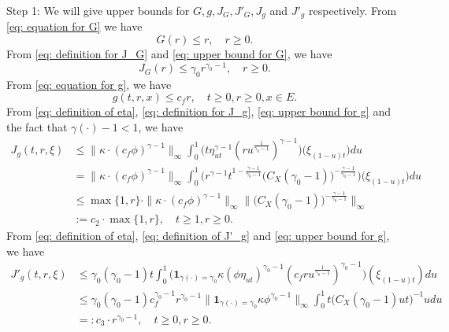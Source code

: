 \documentclass[12pt, a4paper]{amsart}
\theoremstyle{definition}
\numberwithin{equation}{section}
\begin{document}
	Step 1:
	We will give upper bounds for $G,g, J_G, J'_G, J_g$ and $J'_g$ respectively.
	From \eqref{eq: equation for G} we have
\begin{equation}\label{eq: upper bound for G}
	G(r)
	\leq r,
	\quad r \geq 0.
\end{equation}	
	From \eqref{eq: definition for J_G} and \eqref{eq: upper bound for G}, we have
\begin{equation}\label{eq: upper bound for J_G}
	J_G(r)
	\leq \gamma_0 r^{\gamma_0 - 1},
	\quad r \geq 0.
\end{equation}
	From \eqref{eq: equation for g}, we have
\begin{equation}\label{eq: upper bound for g}
	g(t,r, x) \leq c_f r,
	\quad t\geq 0, r \geq 0, x\in E.
\end{equation}
	From \eqref{eq: definition of eta}, \eqref{eq: definition for J_g}, \eqref{eq: upper bound for g} and the fact that $\gamma(\cdot) - 1 < 1$, we have
\begin{equation}\begin{split}
	J_g(t,r, \xi)
	&\leq \|\kappa \cdot (c_f\phi)^{\gamma - 1} \|_\infty \int_0^1 \big(  t\eta_{ut}^{\gamma - 1} (ru^{\frac{1}{\gamma_0 - 1}} )^{\gamma-1}  \big) \big(  \xi_{(1-u)t} \big) du
	\\&= \| \kappa \cdot (c_f\phi)^{\gamma - 1} \|_\infty \int_0^1 \big(  r^{\gamma - 1}t^{1-\frac{\gamma - 1}{\gamma_0 - 1}}  \big( C_X (\gamma_0 - 1) \big)^{-\frac{\gamma - 1}{\gamma_0 - 1}}  \big) \big( \xi_{(1-u)t} \big) du
	\\& \leq \max\{1,r\} \cdot \| \kappa \cdot (c_f\phi)^{\gamma - 1} \|_\infty \Big\|  \big( C_X (\gamma_0 - 1) \big)^{-\frac{\gamma - 1}{\gamma_0 - 1}}\Big\|_\infty
	\\& := c_2 \cdot \max  \{1,r\},
	\quad t\geq 1, r\geq 0.
\end{split}\end{equation}
	From \eqref{eq: definition of eta}, \eqref{eq: definition of J'_g} and \eqref{eq: upper bound for g}, we have
\begin{equation}\begin{split}
	J'_g(t,r,\xi)
	&\leq \gamma_0 (\gamma_0 - 1) t \int_0^1 \big( \mathbf 1_{\gamma(\cdot) = \gamma_0} \kappa (\phi \eta_{ut})^{\gamma_0 - 1} (c_f ru^{\frac{1}{\gamma_0 - 1}})^{\gamma_0 - 1}\big) (\xi_{(1-u)t}) du
	\\&\leq \gamma_0(\gamma_0 - 1) c_f^{\gamma_0 - 1}r^{\gamma_0 - 1} \|  \mathbf 1_{\gamma(\cdot) = \gamma_0}  \kappa \phi^{\gamma_0 - 1} \|_\infty \int_0^1 t \big( C_X(\gamma_0 - 1) ut \big)^{- 1}  u  du
	\\&=: c_3 \cdot r^{\gamma_0 - 1},
	\quad t\geq 0, r\geq 0.
\end{split}\end{equation}
\end{document}
